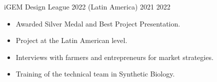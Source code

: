 \documentclass{simplecv}
\begin{document}
    {iGEM Design League 2022 (Latin America)}
    {}
    {2021}
    {2022}
    {%
        \vspace{-11pt}
        \begin{itemize}[leftmargin=*]
        \setlength{\itemsep}{0cm}
          \item Awarded Silver Medal and Best Project Presentation.
          \item Project at the Latin American level.
          \item Interviews with farmers and entrepreneurs for market strategies.
          \item Training of the technical team in Synthetic Biology.
        \end{itemize}
    }
    
\end{document}
